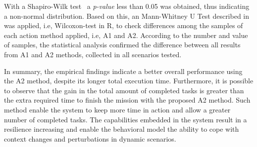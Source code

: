 With a Shapiro-Wilk test~\citep{stat001} a \textit{p-value} less than 0.05 was obtained, thus indicating a non-normal distribution. Based on this, an Mann-Whitney U Test described in~\cite{stat002} was applied, i.e, Wilcoxon-test in R, to check differences among the samples of each action method applied, i.e, A1 and A2. According to the number and value of samples, the statistical analysis confirmed the difference between all results from A1 and A2 methods, collected in all scenarios tested.

In summary, the empirical findings indicate a better overall performance using the A2 method, despite its longer total execution time. Furthermore, it is possible to observe that the gain in the total amount of completed tasks is greater than the extra required time to finish the mission with the proposed A2 method. Such method enable the system to keep more time in action and allow a greater number of completed tasks. The capabilities embedded in the system result in a resilience increasing and enable the behavioral model the ability to cope with context changes and perturbations in dynamic scenarios.
